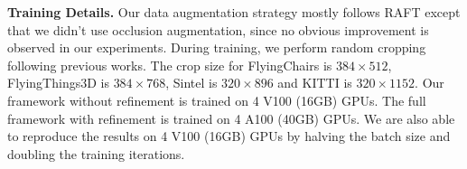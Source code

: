 \documentclass[10pt,twocolumn,letterpaper]{article}
\begin{document}
{\bf Training Details.} Our data augmentation strategy mostly follows RAFT \cite{teed2020raft} except that we didn't use occlusion augmentation, since no obvious improvement is observed in our experiments. During training, we perform random cropping following previous works. The crop size for FlyingChairs is $384 \times 512$, FlyingThings3D is $384 \times 768$, Sintel is $320 \times 896$ and KITTI is $320 \times 1152$. Our framework without refinement is trained on 4 V100 (16GB) GPUs. The full framework with refinement is trained on 4 A100 (40GB) GPUs. We are also able to reproduce the results on 4 V100 (16GB) GPUs by halving the batch size and doubling the training iterations.
\end{document}
